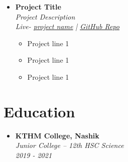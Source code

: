 \documentclass[11pt, oneside, a4paper, titlepage]{article}
\begin{document}
\begin{tcolorbox}
\begin{minipage}[t]{11cm}
\begin{tcolorbox}[grow to right by=0.75cm,colframe=white,colback=white]
\begin{itemize}
        \item
        {
          \textbf{Project Title} \\
          \textit{Project Description} \\
          \textit{Live- \href{url}{\underline{project name}} | \href{https://github.com/SazedWorldbringer}{\underline{GitHub Repo}}} \\
          \vspace*{-0.7cm}
          \begin{itemize}
            \item Project line 1
            \item Project line 1
            \item Project line 1
          \end{itemize}
        }
      \end{itemize}
      \section*{Education}
      \begin{itemize}
        \item
        {
          \textbf{KTHM College, Nashik} \\
          \textit{Junior College -- 12th HSC Science} \\
          \textit{2019 - 2021} \\
        }
      \end{itemize}
    \end{tcolorbox}
  \end{minipage}
\end{tcolorbox}
\end{document}

